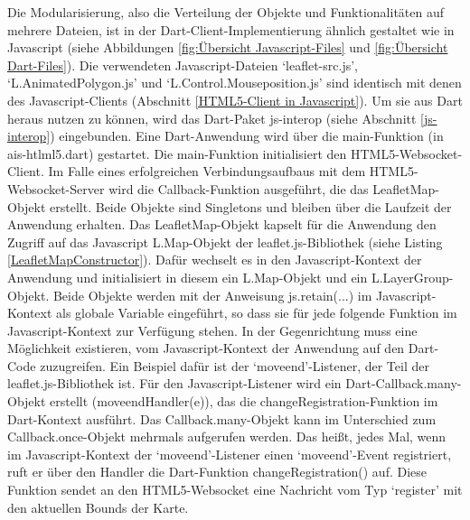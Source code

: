 Die Modularisierung, also die Verteilung der Objekte und Funktionalitäten auf mehrere Dateien, ist in der Dart-Client-Implementierung ähnlich gestaltet wie in Javascript (siehe Abbildungen \ref{fig:Übersicht Javascript-Files} und \ref{fig:Übersicht Dart-Files}). Die verwendeten Javascript-Dateien ‘leaflet-src.js’, ‘L.AnimatedPolygon.js’ und ‘L.Control.Mouseposition.js’ sind identisch mit denen des Javascript-Clients (Abschnitt \ref{HTML5-Client in Javascript}). Um sie aus Dart heraus nutzen zu können, wird das Dart-Paket js-interop (siehe Abschnitt \ref{js-interop}) eingebunden.
Eine Dart-Anwendung wird über die main-Funktion (in ais-htlml5.dart) gestartet. Die main-Funktion initialisiert den HTML5-Websocket-Client. Im Falle eines erfolgreichen Verbindungsaufbaus mit dem HTML5-Websocket-Server wird die Callback-Funktion ausgeführt, die das LeafletMap-Objekt erstellt. Beide Objekte sind Singletons und bleiben über die Laufzeit der Anwendung erhalten.
Das LeafletMap-Objekt kapselt für die Anwendung den Zugriff auf das Javascript L.Map-Objekt der leaflet.js-Bibliothek (siehe Listing \ref{LeafletMapConstructor}). Dafür wechselt es in den Javascript-Kontext der Anwendung und initialisiert in diesem ein L.Map-Objekt und ein L.LayerGroup-Objekt. Beide Objekte werden mit der Anweisung js.retain(...) im Javascript-Kontext als globale Variable eingeführt, so dass sie für jede folgende Funktion im Javascript-Kontext zur Verfügung stehen.
In der Gegenrichtung muss eine Möglichkeit existieren, vom Javascript-Kontext der Anwendung auf den Dart-Code zuzugreifen. Ein Beispiel dafür ist der ‘moveend’-Listener, der Teil der leaflet.js-Bibliothek ist. Für den Javascript-Listener wird ein Dart-Callback.many-Objekt erstellt (moveendHandler(e)), das die changeRegistration-Funktion im Dart-Kontext ausführt. Das Callback.many-Objekt kann im Unterschied zum Callback.once-Objekt mehrmals aufgerufen werden. Das heißt, jedes Mal, wenn im Javascript-Kontext der  ‘moveend’-Listener einen  ‘moveend’-Event registriert, ruft er über den Handler die Dart-Funktion changeRegistration() auf. Diese Funktion sendet an den HTML5-Websocket eine Nachricht vom Typ ‘register’ mit den aktuellen Bounds der Karte.

